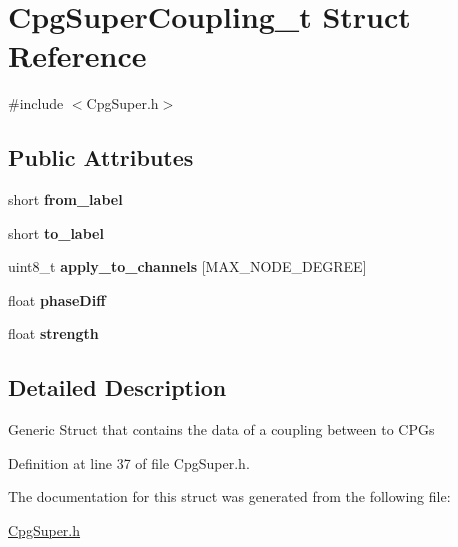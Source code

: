 \hypertarget{structCpgSuperCoupling__t}{
\section{CpgSuperCoupling\_\-t Struct Reference}
\label{structCpgSuperCoupling__t}
}


{\ttfamily \#include $<$CpgSuper.h$>$}

\subsection*{Public Attributes}
\begin{DoxyCompactItemize}
\item 
\hypertarget{structCpgSuperCoupling__t_ae67bc9f3cbd6b1bb3c5fe494a143e42b}{
short {\bfseries from\_\-label}}
\label{structCpgSuperCoupling__t_ae67bc9f3cbd6b1bb3c5fe494a143e42b}

\item 
\hypertarget{structCpgSuperCoupling__t_a8731aa2207e8ba9cf8b4b7e1d00912fb}{
short {\bfseries to\_\-label}}
\label{structCpgSuperCoupling__t_a8731aa2207e8ba9cf8b4b7e1d00912fb}

\item 
\hypertarget{structCpgSuperCoupling__t_ae76dac73c52bf696437b353df545feeb}{
uint8\_\-t {\bfseries apply\_\-to\_\-channels} \mbox{[}MAX\_\-NODE\_\-DEGREE\mbox{]}}
\label{structCpgSuperCoupling__t_ae76dac73c52bf696437b353df545feeb}

\item 
\hypertarget{structCpgSuperCoupling__t_af7d6dec129cf26f4e583041db5fc4528}{
float {\bfseries phaseDiff}}
\label{structCpgSuperCoupling__t_af7d6dec129cf26f4e583041db5fc4528}

\item 
\hypertarget{structCpgSuperCoupling__t_a5f139f169150ab7313b6e4aff980aee2}{
float {\bfseries strength}}
\label{structCpgSuperCoupling__t_a5f139f169150ab7313b6e4aff980aee2}

\end{DoxyCompactItemize}


\subsection{Detailed Description}
Generic Struct that contains the data of a coupling between to CPGs 

Definition at line 37 of file CpgSuper.h.



The documentation for this struct was generated from the following file:\begin{DoxyCompactItemize}
\item 
\hyperlink{CpgSuper_8h}{CpgSuper.h}\end{DoxyCompactItemize}
